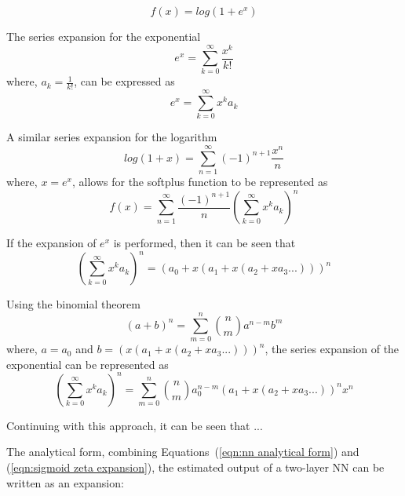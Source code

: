 \begin{equation}
	f(x) = log(1+e^x)
\end{equation}

The series expansion for the exponential
\begin{equation}
	e^x = \sum_{k=0}^\infty \frac{x^k}{k!}
\end{equation}
where, $a_k = \frac{1}{k!}$, can be expressed as
\begin{equation}
	e^x = \sum_{k=0}^\infty x^k a_k
\end{equation}

A similar series expansion for the logarithm
\begin{equation}
	log(1+x) = \sum_{n=1}^\infty (-1)^{n+1} \frac{x^n}{n}
\end{equation}
where, $x = e^x$,
allows for the softplus function to be represented as
\begin{equation}
	f(x) = \sum_{n=1}^\infty \frac{(-1)^{n+1}}{n} (\sum_{k=0}^\infty x^k a_k)^n
\end{equation}

If the expansion of $e^x$ is performed, then it can be seen that
\begin{equation}
	(\sum_{k=0}^\infty x^k a_k)^n = (a_0+x(a_1+x(a_2+xa_3...)))^n
\end{equation}

Using the binomial theorem
\begin{equation}
	(a+b)^n = \sum_{m=0}^{n} \binom{n}{m} a^{n-m} b^m
\end{equation}
where, $a=a_0$ and $b=(x(a_1+x(a_2+xa_3...)))^n$, the series expansion of the exponential can be represented as
\begin{equation}
	(\sum_{k=0}^\infty x^k a_k)^n = \sum_{m=0}^{n} 				\binom{n}{m} a_0^{n-m} (a_1+x(a_2+xa_3...))^n x^n
\end{equation}

Continuing with this approach, it can be seen that ...

The analytical form, combining Equations~(\ref{eqn:nn analytical form}) and (\ref{eqn:sigmoid zeta expansion}), the estimated output of a two-layer NN can be written as an expansion:

